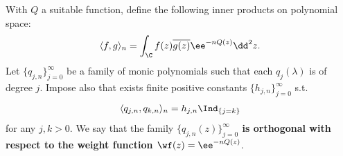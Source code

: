  \begin{definicao} \label{Definition: internal product}
	With $Q$ a suitable function, define the following inner products on polynomial space:
	\begin{equation}
		\langle f,g \rangle_n = \int_{\C} f(z) \overline{g(z)} \ee^{-nQ(z)} \dd^2 z.
	\end{equation}
	Let $\{q_{j,n}\}_{j=0}^\infty$ be a family of monic polynomials such that each $q_j(\lambda)$ is of degree $j$. Impose also that exists finite positive constants $\{h_{j,n}\}_{j=0}^\infty$ s.t.
	\begin{equation}
		\langle q_{j,n}, q_{k,n} \rangle_n = h_{j,n} \Ind_{\{j=k\}}
	\end{equation}	
	for any $j,k>0$. We say that the family \textbf{$\{q_{j,n}(z)\}_{j=0}^\infty$ is orthogonal with respect to the weight function $\wf(z) = \ee^{-nQ(z)}$}.
\end{definicao}


